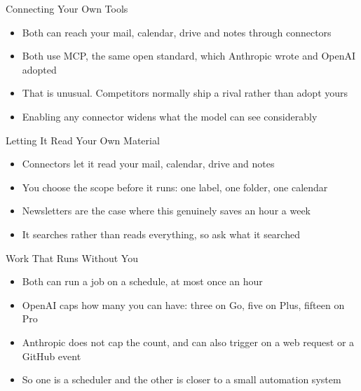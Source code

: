 \documentclass[aspectratio=169]{beamer}
\begin{document}
\begin{frame}{Connecting Your Own Tools}
    \begin{itemize}
        \item Both can reach your mail, calendar, drive and notes through connectors
        \item Both use MCP, the same open standard, which Anthropic wrote and OpenAI adopted
        \item That is unusual. Competitors normally ship a rival rather than adopt yours
        \item Enabling any connector widens what the model can see considerably
    \end{itemize}
\end{frame}

\begin{frame}{Letting It Read Your Own Material}
    \begin{itemize}
        \item Connectors let it read your mail, calendar, drive and notes
        \item You choose the scope before it runs: one label, one folder, one calendar
        \item Newsletters are the case where this genuinely saves an hour a week
        \item It searches rather than reads everything, so ask what it searched
    \end{itemize}
\end{frame}

\begin{frame}{Work That Runs Without You}
    \begin{itemize}
        \item Both can run a job on a schedule, at most once an hour
        \item OpenAI caps how many you can have: three on Go, five on Plus, fifteen on Pro
        \item Anthropic does not cap the count, and can also trigger on a web request or a
              GitHub event
        \item So one is a scheduler and the other is closer to a small automation system
    \end{itemize}
\end{frame}
\end{document}
